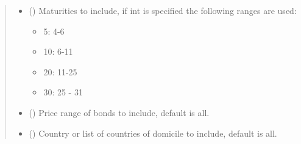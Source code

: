 \documentclass[letterpaper,10pt,english]{report}
\begin{document}
\begin{fulllineitems}
\begin{fulllineitems}
\begin{quote}
\begin{description}
\begin{itemize}
\item {} 
 (\sphinxstyleliteralemphasis{\sphinxupquote{{[}}}\sphinxstyleliteralemphasis{\sphinxupquote{, }}\sphinxstyleliteralemphasis{\sphinxupquote{{]}}}\sphinxstyleliteralemphasis{\sphinxupquote{, }}\sphinxstyleliteralemphasis{\sphinxupquote{, }}\sphinxstyleliteralemphasis{\sphinxupquote{, }}\sphinxstyleliteralemphasis{\sphinxupquote{, }}\sphinxstyleliteralemphasis{\sphinxupquote{, }}) \textendash{} 
Maturities to include, if int is specified the following ranges
are used:
\begin{itemize}
\item {} 
5: 4-6

\item {} 
10: 6-11

\item {} 
20: 11-25

\item {} 
30: 25 - 31

\end{itemize}


\item {} 
 (\sphinxstyleliteralemphasis{\sphinxupquote{{[}}}\sphinxstyleliteralemphasis{\sphinxupquote{, }}\sphinxstyleliteralemphasis{\sphinxupquote{{]}}}\sphinxstyleliteralemphasis{\sphinxupquote{)}}\sphinxstyleliteralemphasis{\sphinxupquote{, }}\sphinxstyleliteralemphasis{\sphinxupquote{(}}\sphinxstyleliteralemphasis{\sphinxupquote{, }}\sphinxstyleliteralemphasis{\sphinxupquote{)}}\sphinxstyleliteralemphasis{\sphinxupquote{}}) \textendash{} Price range of bonds to include, default is all.

\item {} 
 (\sphinxstyleliteralemphasis{\sphinxupquote{, }}\sphinxstyleliteralemphasis{\sphinxupquote{{[}}}\sphinxstyleliteralemphasis{\sphinxupquote{{]}}}\sphinxstyleliteralemphasis{\sphinxupquote{, }}) \textendash{} Country or list of countries of domicile to include, default is all.


\end{itemize}
\end{description}
\end{quote}
\end{fulllineitems}
\end{fulllineitems}
\end{document}
